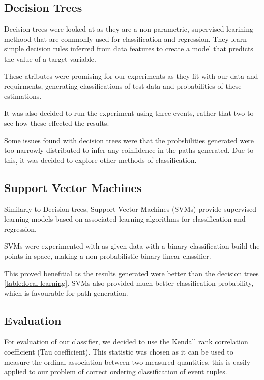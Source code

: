 \documentclass[12pt]{report}
\begin{document}
\subsection{Decision Trees}
Decision trees were looked at as they are a non-parametric, supervised learining methood
that are commonly used for classification and regression. They learn simple decision rules inferred from
data features to create a model that predicts the value of a target variable.

These atributes were promising for our experiments as they fit with our data and requirments, generating
classifications of test data and probabilities of these estimations.

It was also decided to run the experiment using three events, rather that two to see how these
effected the results. 

Some issues found with decision trees were that the probsbilities generated were too narrowly distributed
to infer any coinfidence in the paths generated. Due to this, it was decided to explore other methods of
classification.

\subsection{Support Vector Machines}
Similarly to Decision trees, Support Vector Machines (SVMs) provide supervised learning models based on
associated learning algorithms for classification and regression.

SVMs were experimented with as given data with a binary classification build the points in space,
making a non-probabilistic binary linear classifier.

This proved benefitial as the results generated were better than the decision trees \ref{table:local-learning}.
SVMs also provided much better classification probability, which is favourable for path generation.

\subsection{Evaluation}
For evaluation of our classifier, we decided to use the Kendall rank correlation coefficient (Tau coefficient).
This statistic was chosen as it can be used to measure the ordinal association between two measured quantities,
this is easily applied to our problem of correct ordering classification of event tuples.\\ 
\end{document}

